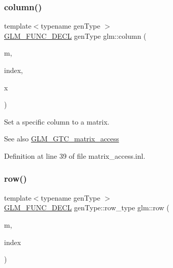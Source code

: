 \subsubsection{\texorpdfstring{column()}{column()}\hspace{0.1cm}{\footnotesize\ttfamily [2/2]}}
{\footnotesize\ttfamily template$<$typename gen\+Type $>$ \\
\mbox{\hyperlink{setup_8hpp_ab2d052de21a70539923e9bcbf6e83a51}{G\+L\+M\+\_\+\+F\+U\+N\+C\+\_\+\+D\+E\+CL}} gen\+Type glm\+::column (\begin{DoxyParamCaption}\item[{gen\+Type const \&}]{m,  }\item[{\mbox{\hyperlink{namespaceglm_a090a0de2260835bee80e71a702492ed9}{length\+\_\+t}}}]{index,  }\item[{typename gen\+Type\+::col\+\_\+type const \&}]{x }\end{DoxyParamCaption})}

Set a specific column to a matrix. \begin{DoxySeeAlso}{See also}
\mbox{\hyperlink{group__gtc__matrix__access}{G\+L\+M\+\_\+\+G\+T\+C\+\_\+matrix\+\_\+access}} 
\end{DoxySeeAlso}


Definition at line 39 of file matrix\+\_\+access.\+inl.

\mbox{\label{group__gtc__matrix__access_ga259e5ebd0f31ec3f83440f8cae7f5dba}} 
\subsubsection{\texorpdfstring{row()}{row()}\hspace{0.1cm}{\footnotesize\ttfamily [1/2]}}
{\footnotesize\ttfamily template$<$typename gen\+Type $>$ \\
\mbox{\hyperlink{setup_8hpp_ab2d052de21a70539923e9bcbf6e83a51}{G\+L\+M\+\_\+\+F\+U\+N\+C\+\_\+\+D\+E\+CL}} gen\+Type\+::row\+\_\+type glm\+::row (\begin{DoxyParamCaption}\item[{gen\+Type const \&}]{m,  }\item[{\mbox{\hyperlink{namespaceglm_a090a0de2260835bee80e71a702492ed9}{length\+\_\+t}}}]{index }\end{DoxyParamCaption})}

